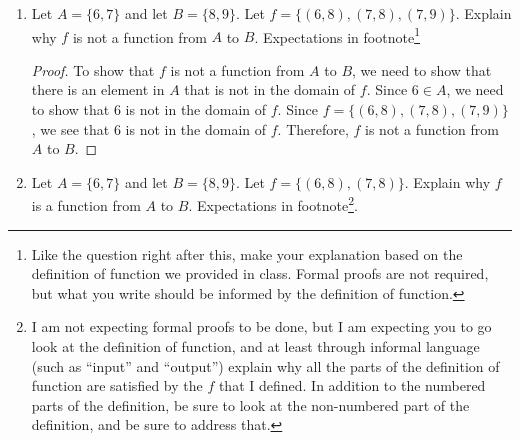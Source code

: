 \documentclass{article}
\begin{document}
\begin{enumerate}
\begin{proof}
    Let $h \in T$ be arbitrary. Suppose $h$ plays tennis. Since $h \in T$ and $T \subseteq G$, we have $h \in G$. Since $h \in G$, by the definition of $G$, the ice skating performance featured $h$. Since the ice skating performance featured $h$, by H6, we have $h \in L$. Since $h \in L$, by the definition of $G$, we have $h \in G$. Since $h \in G$, by H3, we have $h \in T$. Since $h \in T$, by the definition of $T$, we have $h \in G$. Since $h \in G$, by the definition of $G$, we have $h \in L$. Since $h \in L$, by the definition of $G$, we have $h \in G$. Since $h \in G$, by H3, we have $h \in T$. Since $h \in T$, by the definition of $T$, we have $h \in G$. Since $h \in G$, by the definition of $G$, we have $h \in L$. Since $h \in L$, by the definition of $G$, we have $h \in G$. Since $h \in G$, by H3, we have $h \in T$. Since $h \in T$, by the definition of $T$, we have $h \in G$. Since $h \in G$, by the definition of $G$, we have $h \in L$. Since $h \in L$, by the definition of $G$, we have $h \in G$. Since $h \in G$, by H3, we have $h \in T$. Since $h \in T$, by the definition of $T$, we have $h \in G$. Since $h \in G$, by the definition of $G$, we have $h \in L$. Since $h \in L$, by the definition of $G$, we have $h \in G$. Since $h \in G$, by H3, we have $h \in T$. Since $h \in T$, by the definition of $T$, we have $h \in G$. Since $h \in G$, by the definition of $G$.
\end{proof}

\newpage

\item Let $A = \{6,7\}$ and let $B=\{8,9\}$. Let $f=\{(6,8),(7,8),(7,9)\}$. Explain why $f$ is not a function from $A$ to $B$. Expectations in footnote\footnote{Like the question right after this, make your explanation based on the definition of function we provided in class. Formal proofs are not required, but what you write should be informed by the definition of function.}

\begin{proof}
    To show that $f$ is not a function from $A$ to $B$, we need to show that there is an element in $A$ that is not in the domain of $f$. Since $6 \in A$, we need to show that $6$ is not in the domain of $f$. Since $f = \{(6,8),(7,8),(7,9)\}$, we see that $6$ is not in the domain of $f$. Therefore, $f$ is not a function from $A$ to $B$.
\end{proof}

\newpage

\item Let $A = \{6,7\}$ and let $B=\{8,9\}$. Let $f=\{(6,8),(7,8)\}$. Explain why $f$ is a function from $A$ to $B$. Expectations in footnote\footnote{I am not expecting formal proofs to be done, but I am expecting you to go look at the definition of function, and at least through informal language (such as ``input'' and ``output'') explain why all the parts of the definition of function are satisfied by the $f$ that I defined. In addition to the numbered parts of the definition, be sure to look at the non-numbered part of the definition, and be sure to address that.}.


\end{enumerate}
\end{document}
